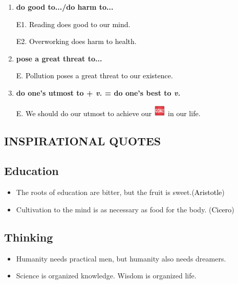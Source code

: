 \documentclass{article}
\begin{document}
\begin{enumerate}
\item \textbf{do good to.../do harm to...}

  \textcolor{black}{E1}. \textcolor{black}{Reading does good to our mind.}

  \textcolor{black}{E2}. \textcolor{black}{Overworking does harm to health.}

\item \textbf{pose a great threat to...}

  \textcolor{black}E. \textcolor{black}{Pollution poses a great threat to our existence.}

\item \textbf{do one's utmost to + \emph{v.} = do one's best to \emph{v.}}

  \textcolor{black}E. \textcolor{black}{We should do our utmost to achieve our
  }\includegraphics[height=1.5em]{goal} \textcolor{black}{in our life.}

  
  
\end{enumerate}

\begin{center}
  \section{INSPIRATIONAL QUOTES}
  \label{sec:inspirational-quotes}
\end{center}

\subsection{Education}
\label{sec:education}

\begin{itemize}
\item The roots of education are bitter, but the fruit is
  sweet.(\textcolor{black}{Aristotle})
  
\item Cultivation to the mind is as necessary as food for the
body. (\textcolor{black}{Cicero})
\end{itemize}


\subsection{Thinking}
\label{sec:thinking}

\begin{itemize}
\item Humanity needs practical men, but humanity also needs dreamers.
\item Science is organized knowledge. Wisdom is organized life.
\end{itemize}
\end{document}
